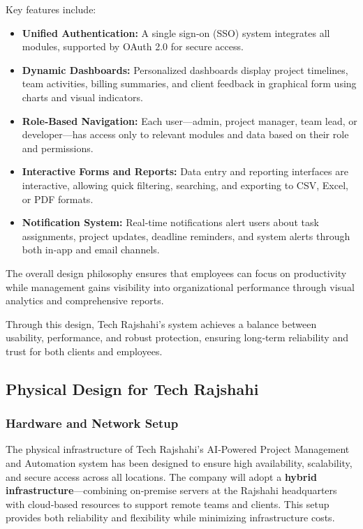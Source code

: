 \documentclass[12pt,a4paper]{article}
\begin{document}
Key features include:
\begin{itemize}
    \item \textbf{Unified Authentication:} A single sign‑on (SSO) system integrates all modules, supported by OAuth 2.0 for secure access.
    
    \item \textbf{Dynamic Dashboards:} Personalized dashboards display project timelines, team activities, billing summaries, and client feedback in graphical form using charts and visual indicators.
    
    \item \textbf{Role‑Based Navigation:} Each user—admin, project manager, team lead, or developer—has access only to relevant modules and data based on their role and permissions.
    
    \item \textbf{Interactive Forms and Reports:} Data entry and reporting interfaces are interactive, allowing quick filtering, searching, and exporting to CSV, Excel, or PDF formats.
    
    \item \textbf{Notification System:} Real‑time notifications alert users about task assignments, project updates, deadline reminders, and system alerts through both in‑app and email channels.
\end{itemize}

The overall design philosophy ensures that employees can focus on productivity while management gains visibility into organizational performance through visual analytics and comprehensive reports.


Through this design, Tech Rajshahi's system achieves a balance between usability, performance, and robust protection, ensuring long‑term reliability and trust for both clients and employees.

\subsection{Physical Design for Tech Rajshahi}

\subsubsection{Hardware and Network Setup}
The physical infrastructure of Tech Rajshahi's AI‑Powered Project Management and Automation system has been designed to ensure high availability, scalability, and secure access across all locations.  The company will adopt a \textbf{hybrid infrastructure}—combining on‑premise servers at the Rajshahi headquarters with cloud‑based resources to support remote teams and clients.  This setup provides both reliability and flexibility while minimizing infrastructure costs.
\end{document}
